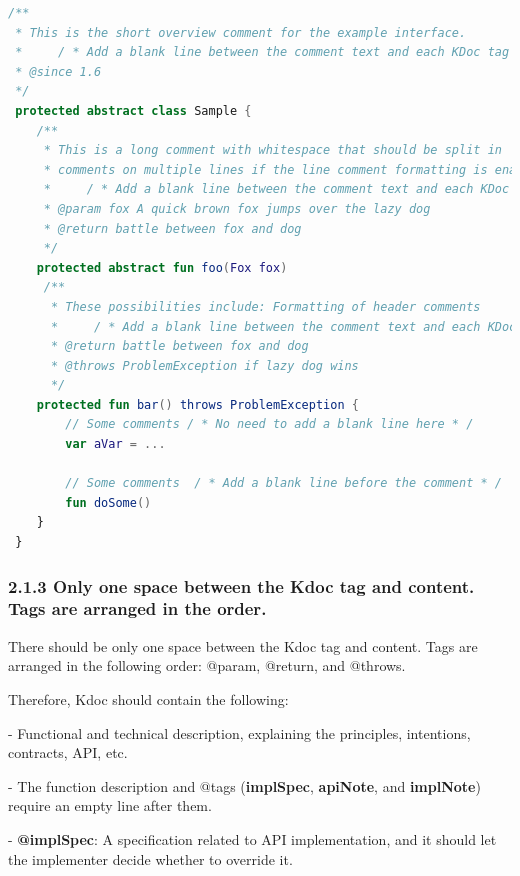 \begin{lstlisting}[language=Kotlin]
/** 
 * This is the short overview comment for the example interface.
 *     / * Add a blank line between the comment text and each KDoc tag underneath * /
 * @since 1.6
 */
 protected abstract class Sample {
    /**
     * This is a long comment with whitespace that should be split in 
     * comments on multiple lines if the line comment formatting is enabled.
     *     / * Add a blank line between the comment text and each KDoc tag underneath * /
     * @param fox A quick brown fox jumps over the lazy dog
     * @return battle between fox and dog 
     */
    protected abstract fun foo(Fox fox)
     /**
      * These possibilities include: Formatting of header comments
      *     / * Add a blank line between the comment text and each KDoc tag underneath * /
      * @return battle between fox and dog
      * @throws ProblemException if lazy dog wins
      */
    protected fun bar() throws ProblemException {
        // Some comments / * No need to add a blank line here * /   
        var aVar = ...

        // Some comments  / * Add a blank line before the comment * /   
        fun doSome()
    }
 }
\end{lstlisting}


\subsubsection*{\textbf{2.1.3 Only one space between the Kdoc tag and content. Tags are arranged in the order.}}
\leavevmode\newline

\label{sec:2.1.3}



There should be only one space between the Kdoc tag and content. Tags are arranged in the following order: @param, @return, and @throws.



Therefore, Kdoc should contain the following:

- Functional and technical description, explaining the principles, intentions, contracts, API, etc.

- The function description and @tags (\textbf{implSpec}, \textbf{apiNote}, and \textbf{implNote}) require an empty line after them.

- \textbf{@implSpec}: A specification related to API implementation, and it should let the implementer decide whether to override it.

